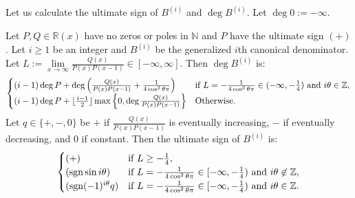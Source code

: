 \documentclass[a4paper,UKenglish,cleveref,autoref,thm-restate]{lipics-v2021}
\newcommand{\R}{\mathbb{R}}
\newcommand{\N}{\mathbb{N}}
\newcommand{\Z}{\mathbb{Z}}
\DeclareMathOperator{\sgn}{sgn}
\begin{document}
Let us calculate the ultimate sign of $B^{(i)}$ and $\deg B^{(i)}$. Let $\deg 0 := - \infty$. 

\begin{lemma} \label{lem:B^i}
Let $P, Q \in \R(x)$ have no zeros or poles in $\N$ and $P$ have the ultimate sign $(+)$. Let $i \geq 1$ be an integer and $B^{(i)}$ be the generalized $i$th canonical denominator. Let $L := \lim\limits_{x \to \infty} \frac{Q(x)}{P(x)P(x-1)} \in [-\infty, \infty]$. Then $\deg B^{(i)}$ is:
\[
\begin{cases}
    (i-1) \deg P + \deg \left( \frac{Q(x)}{P(x)P(x-1)} + \frac1{4\cos^2 \theta \pi} \right) & \text{if $L = -\frac1{4 \cos^2 \theta \pi} \in (-\infty, -\frac14)$ and $ i \theta \in \Z$},
    \\
    (i-1) \deg P + \lfloor \frac{i-1}2 \rfloor \max\left\{ 0, \deg \frac{Q(x)}{P(x)P(x-1)} \right\} &  \text{Otherwise}.
\end{cases}
\]
Let $q \in \{ +, -, 0 \}$ be $+$ if $\frac{Q(x)}{P(x)P(x-1)}$ is eventually increasing, $-$ if eventually decreasing, and $0$ if constant. Then the ultimate sign of $B^{(i)}$ is:
\[
\begin{cases}
    (+) &  \text{if $L \geq -\frac14$},
    \\
    (\sgn \sin i \theta) & \text{if $L = -\frac1{4 \cos^2 \theta \pi} \in [-\infty, -\frac14) $ and $ i \theta \not\in \Z$},
    \\
    (\sgn (-1)^{i \theta} q) & \text{if $L = -\frac1{4 \cos^2 \theta \pi} \in [-\infty, -\frac14)$ and $ i \theta \in \Z$}.
\end{cases}
\]
\end{lemma}
\end{document}
